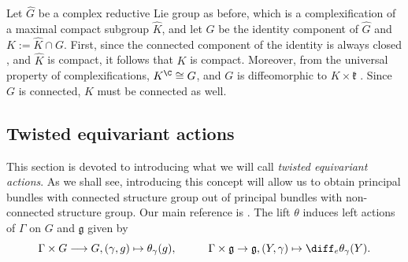 \begin{obs} \label{k_connected_kc_G}
    Let \(\hat{G}\) be a complex reductive Lie group as before, which is a complexification of a maximal compact subgroup \(\hat{K}\), and let \(G\) be the identity component of \(\hat{G}\) and \(K:=\hat{K}\cap G\). First, since the connected component of the identity is always closed \parencite[Lemma 7.11 and Prop. 7.15]{lee_introCM}, and \(\hat{K}\) is compact, it follows that \(K\) is compact. Moreover, from the universal property of complexifications, \(K^\C \cong G\), and \(G\) is diffeomorphic to \(K \times \mathfrak{k}\) \parencite[Prop. 15.2.1-(c)]{hilgert2011structure}. Since \(G\) is connected, \(K\) must be connected as well.
\end{obs}

\subsection{Twisted equivariant actions}
This section is devoted to introducing what we will call \textit{twisted equivariant actions}. As we shall see, introducing this concept will allow us to obtain principal bundles with connected structure group out of principal bundles with non-connected structure group. Our main reference is \parencite{barajas2023non}. The lift \(\theta\) induces left actions of \(\Gamma\) on \(G\) and \(\mathfrak{g}\) given by 
\begin{equation} \label{eq_Gamma_action_G}
\Gamma \times G \longrightarrow G, (\gamma,g) \mapsto \theta_{\gamma}(g), \hspace{1 cm} \Gamma \times \mathfrak{g} \to \mathfrak{g}, (Y, \gamma) \mapsto \diff_e\theta_{\gamma}(Y).
\end{equation}

